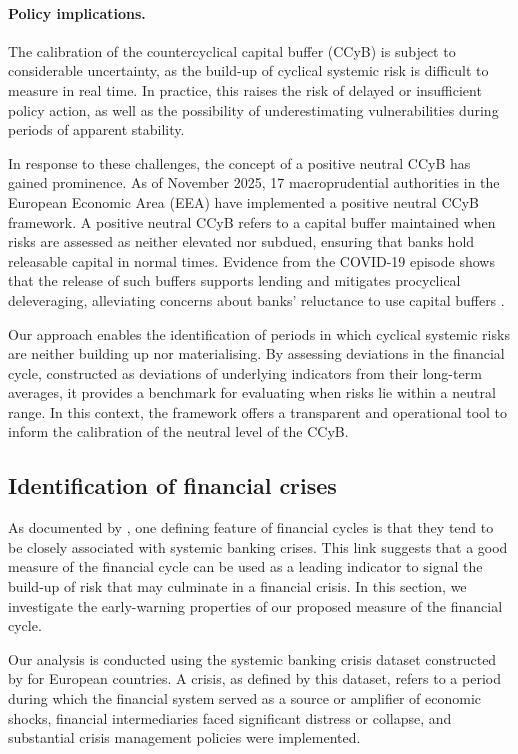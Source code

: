 \paragraph{Policy implications.}

The calibration of the countercyclical capital buffer (CCyB) is subject to considerable uncertainty, as the build-up of cyclical systemic risk is difficult to measure in real time. In practice, this raises the risk of delayed or insufficient policy action, as well as the possibility of underestimating vulnerabilities during periods of apparent stability.

In response to these challenges, the concept of a positive neutral CCyB has gained prominence. As of November 2025, 17 macroprudential authorities in the European Economic Area (EEA) have implemented a positive neutral CCyB framework. A positive neutral CCyB refers to a capital buffer maintained when risks are assessed as neither elevated nor subdued, ensuring that banks hold releasable capital in normal times. Evidence from the COVID-19 episode shows that the release of such buffers supports lending and mitigates procyclical deleveraging, alleviating concerns about banks' reluctance to use capital buffers \citep{avezum2024assessment, berrospide2021used, ecbesrb2026usability}.

Our approach enables the identification of periods in which cyclical systemic risks are neither building up nor materialising. By assessing deviations in the financial cycle, constructed as deviations of underlying indicators from their long-term averages, it provides a benchmark for evaluating when risks lie within a neutral range. In this context, the framework offers a transparent and operational tool to inform the calibration of the neutral level of the CCyB.

\subsection{Identification of financial crises}

As documented by \citet{borio2014financial}, one defining feature of financial cycles is that they tend to be closely associated with systemic banking crises. This link suggests that a good measure of the financial cycle can be used as a leading indicator to signal the build-up of risk that may culminate in a financial crisis. In this section, we investigate the early-warning properties of our proposed measure of the financial cycle.

Our analysis is conducted using the systemic banking crisis dataset constructed by \citet{lo2017new} for European countries. A crisis, as defined by this dataset, refers to a period during which the financial system served as a source or amplifier of economic shocks, financial intermediaries faced significant distress or collapse, and substantial crisis management policies were implemented.

